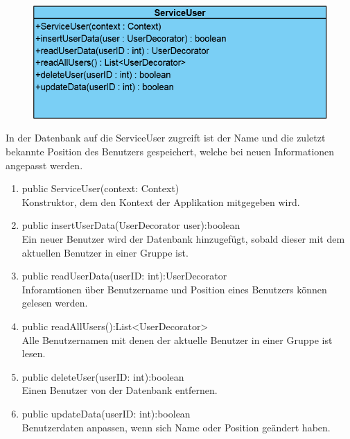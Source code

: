 \begin{figure}[H]
	\includegraphics[scale = .5]{res/umlClasses/ServiceUser.png}
	\centering
\end{figure}
In der Datenbank auf die ServiceUser zugreift ist der Name und die zuletzt bekannte Position des Benutzers gespeichert, welche bei neuen Informationen angepasst werden. 
\begin{enumerate}
	\item public ServiceUser(context: Context)\\
		Konstruktor, dem den Kontext der Applikation mitgegeben wird.
	\item public insertUserData(UserDecorator user):boolean\\
		Ein neuer Benutzer wird der Datenbank hinzugefügt, sobald dieser mit dem aktuellen Benutzer in einer Gruppe ist.
	\item public readUserData(userID: int):UserDecorator\\
		Inforamtionen über Benutzername und Position eines Benutzers können gelesen werden.
	\item public readAllUsers():List<UserDecorator> \\
		Alle Benutzernamen mit denen der aktuelle Benutzer in einer Gruppe ist lesen.
	\item public deleteUser(userID: int):boolean\\
		Einen Benutzer von der Datenbank entfernen.
	\item public updateData(userID: int):boolean\\
		Benutzerdaten anpassen, wenn sich Name oder Position geändert haben.
\end{enumerate}

